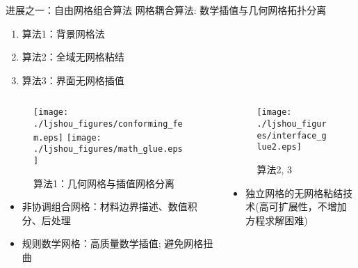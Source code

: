 \documentclass[mathserif]{beamer}
\begin{document}
\begin{CJK}{UTF8}{gkai}
		\begin{frame}{进展之一：自由网格组合算法}
		    网格耦合算法: 数学插值与几何网格拓扑分离
    		\begin{enumerate}
        		\item 算法1：背景网格法
                \item 算法2：全域无网格粘结
                \item 算法3：界面无网格插值
    		\end{enumerate}
    		\begin{columns}
    			\begin{column}[pos]{0.5\textwidth}
    				\begin{figure}
    					\texttt{[image: ./ljshou\_figures/conforming\_fem.eps]}
    					\texttt{[image: ./ljshou\_figures/math\_glue.eps]}
    					\caption{算法1：\color{red}几何网格与插值网格分离}
    				\end{figure}
        			\begin{itemize}
        			    \item {\color{red}非协调}组合网格：材料边界描述、数值积分、后处理
                    \item {\color{red}规则}数学网格：高质量数学插值; 避免网格扭曲
        			\end{itemize}
    			\end{column}

    			\begin{column}[pos]{0.5\textwidth}
    				\begin{figure}
	                	\centering
	                	\texttt{[image: ./ljshou\_figures/interface\_glue2.eps]}
	                	\caption{算法2, 3}
	                \end{figure}
	                \begin{itemize}
	                \item \color{blue}独立网格的无网格粘结技术(高可扩展性，不增加方程求解困难)
	                \end{itemize}
	                
    			\end{column}
		    \end{columns}
		\end{frame}
	

\end{CJK}
\end{document}
